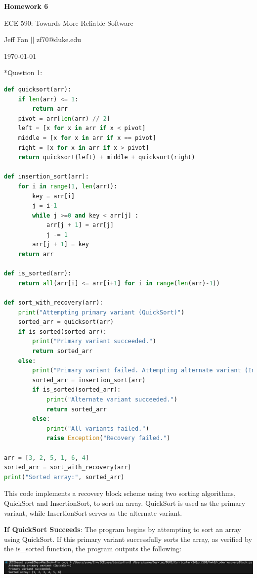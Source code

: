 \documentclass[12pt]{article}
\makeatletter
\numberwithin{table}{section}
\newcommand{\question}[2][]{\begin{flushleft}
		\Large\textbf{Question #1}: \large\textit{#2}
		
\end{flushleft}}
\newcommand{\maketitletwo}[2][]{\begin{center}
		\Large{\textbf{Homework #1}
			
			ECE 590: Towards More Reliable Software} %
		\vspace{5pt}
		
		\normalsize{Jeff Fan  \hspace{1em} $\left|\right|$ \hspace{1em}zf70@duke.edu  %
			
			\today}        %
		\vspace{15pt}
		
\end{center}}
\makeatother
\begin{document}
	\maketitletwo[6]  %
	
	\section*{Question 1: } 
	
	\begin{lstlisting}[language=python]
def quicksort(arr):
	if len(arr) <= 1:
		return arr
	pivot = arr[len(arr) // 2]
	left = [x for x in arr if x < pivot]
	middle = [x for x in arr if x == pivot]
	right = [x for x in arr if x > pivot]
	return quicksort(left) + middle + quicksort(right)
		
def insertion_sort(arr):
	for i in range(1, len(arr)):
		key = arr[i]
		j = i-1
		while j >=0 and key < arr[j] :
			arr[j + 1] = arr[j]
			j -= 1
		arr[j + 1] = key
	return arr
		
def is_sorted(arr):
	return all(arr[i] <= arr[i+1] for i in range(len(arr)-1))
		
def sort_with_recovery(arr):
	print("Attempting primary variant (QuickSort)")
	sorted_arr = quicksort(arr)
	if is_sorted(sorted_arr):
		print("Primary variant succeeded.")
		return sorted_arr
	else:
		print("Primary variant failed. Attempting alternate variant (InsertionSort)")
		sorted_arr = insertion_sort(arr)
		if is_sorted(sorted_arr):
			print("Alternate variant succeeded.")
			return sorted_arr
		else:
			print("All variants failed.")
			raise Exception("Recovery failed.")
		
arr = [3, 2, 5, 1, 6, 4]
sorted_arr = sort_with_recovery(arr)
print("Sorted array:", sorted_arr)\end{lstlisting} 
	
This code implements a recovery block scheme using two sorting algorithms, QuickSort and InsertionSort, to sort an array. QuickSort is used as the primary variant, while InsertionSort serves as the alternate variant.

\textbf{If QuickSort Succeeds}: The program begins by attempting to sort an array using QuickSort. If this primary variant successfully sorts the array, as verified by the is\_sorted function, the program outputs the following:

\begin{center}
	\includegraphics[width=1\textwidth]{image/1.eps}
\end{center}
\end{document}
